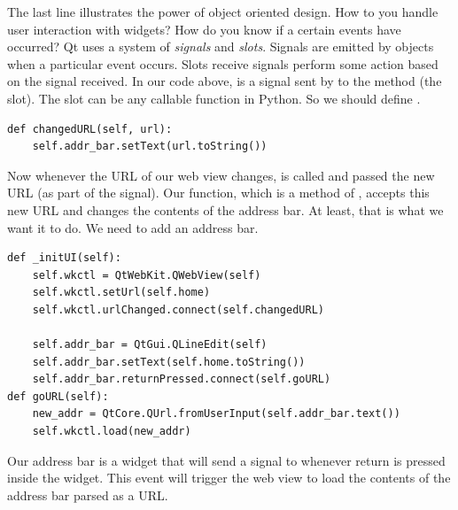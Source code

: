 The last line illustrates the power of object oriented design.  How to you handle user interaction with widgets?  How do you know if a certain events have occurred?  Qt uses a system of \emph{signals} and \emph{slots}.  Signals are emitted by objects when a particular event occurs.  Slots receive signals perform some action based on the signal received.  In our code above,  is a signal sent by  to the method  (the slot).  The slot can be any callable function in Python.  So we should define .
\begin{lstlisting}
def changedURL(self, url):
    self.addr_bar.setText(url.toString())
\end{lstlisting}
Now whenever the URL of our web view changes,  is called and passed the new URL (as part of the signal).  Our function, which is a method of , accepts this new URL and changes the contents of the address bar.  At least, that is what we want it to do.  We need to add an address bar.
\begin{lstlisting}
def _initUI(self):
    self.wkctl = QtWebKit.QWebView(self)
    self.wkctl.setUrl(self.home)
    self.wkctl.urlChanged.connect(self.changedURL)
    
    self.addr_bar = QtGui.QLineEdit(self)
    self.addr_bar.setText(self.home.toString())
    self.addr_bar.returnPressed.connect(self.goURL)
def goURL(self):
    new_addr = QtCore.QUrl.fromUserInput(self.addr_bar.text())
    self.wkctl.load(new_addr)
\end{lstlisting}
Our address bar is a  widget that will send a signal to  whenever return is pressed inside the widget.  This event will trigger the web view to load the contents of the address bar parsed as a URL.

